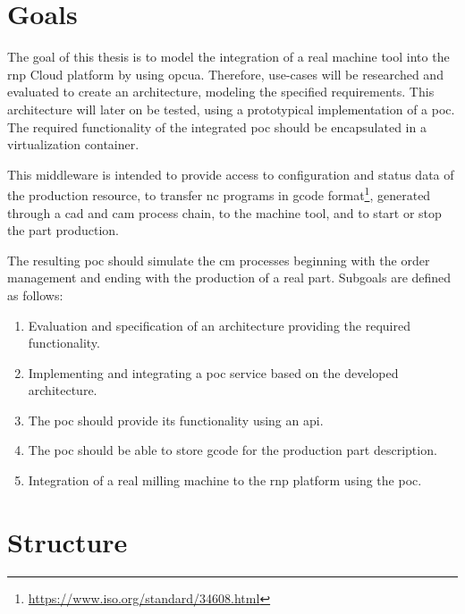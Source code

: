 \documentclass[
a4paper,
twoside,
headsepline,
cleardoublepage=empty,
parskip=half,
draft=false
]{scrbook}
\begin{document}
		\section{Goals}\label{sec:goals}

			The goal of this thesis is to model the integration of a real machine tool into the \gls{rnp} Cloud platform by using \gls{opcua}.
			Therefore, use-cases will be researched and evaluated to create an architecture, modeling the specified requirements.
			This architecture will later on be tested, using a prototypical implementation of a \gls{poc}.
			The required functionality of the integrated \gls{poc} should be encapsulated in a virtualization container.
			
			This middleware is intended to provide access to configuration and status data of the production resource, to transfer \gls{nc} programs in \gls{gcode} format\footnote{\url{https://www.iso.org/standard/34608.html}}, generated through a \gls{cad} and \gls{cam} process chain, to the machine tool, and to start or stop the part production. 
			
			The resulting \gls{poc} should simulate the \gls{cm} processes beginning with the order management and ending with the production of a real part. Subgoals are defined as follows:

			\begin{enumerate}

				\item Evaluation and specification of an architecture providing the required functionality.

				\item Implementing and integrating a \gls{poc} service based on the developed architecture.
				
				\item The \gls{poc} should provide its functionality using an \gls{api}.

				\item The \gls{poc} should be able to store \gls{gcode} for the production part description.

				\item Integration of a real milling machine to the \gls{rnp} platform using the \gls{poc}.

			\end{enumerate}

		\section{Structure}
\end{document}
